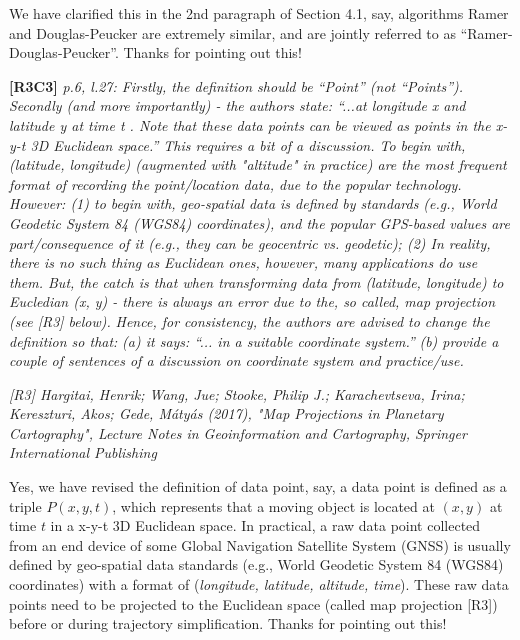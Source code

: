 \documentclass{letter}
\begin{document}
We have clarified this in the 2nd paragraph of Section 4.1, say, algorithms Ramer and Douglas-Peucker are extremely similar, and are jointly referred to as ``Ramer-Douglas-Peucker''.
Thanks for pointing out this!



\textbf{[R3C3]} \emph{p.6, l.27: Firstly, the definition should be ``Point'' (not ``Points''). Secondly (and more importantly) - the authors state: ``...at longitude x and latitude y at time t . Note that these data points can be viewed as points in the x-y-t 3D Euclidean space.'' This requires a bit of a discussion. To begin with, (latitude, longitude) (augmented with "altitude" in practice) are the most frequent format of recording the point/location data, due to the popular technology. However: (1) to begin with, geo-spatial data is defined by standards (e.g., World Geodetic System 84 (WGS84) coordinates), and the popular GPS-based values are part/consequence of it (e.g., they can be geocentric vs. geodetic); (2) In reality, there is no such thing as Euclidean ones, however, many applications do use them. But, the catch is that when transforming data from (latitude, longitude) to Eucledian (x, y) - there is always an error due to the, so called, map projection (see [R3] below).}
\emph{Hence, for consistency, the authors are advised to change the definition so that:}
\emph{(a) it says: ``... in a suitable coordinate system.''}
\emph{(b) provide a couple of sentences of a discussion on coordinate system and practice/use.}

\emph{[R3] Hargitai, Henrik; Wang, Jue; Stooke, Philip J.; Karachevtseva, Irina; Kereszturi, Akos; Gede, Mátyás (2017), "Map Projections in Planetary Cartography", Lecture Notes in Geoinformation and Cartography, Springer International Publishing}

Yes, we have revised the definition of data point, say, a data point is defined as a triple $P(x, y, t)$, {which represents that a moving object is located at {$(x, y)$} at time $t$ in a x-y-t 3D Euclidean space. 
In practical, a raw data point collected from an end device of some Global Navigation Satellite System (GNSS) is usually defined by geo-spatial data standards (e.g., World Geodetic System 84 (WGS84) coordinates) with a format of ({\em longitude, latitude, altitude, time}). These raw data points need to be projected to the Euclidean space (called map projection [R3]) before or during trajectory simplification.} 
Thanks for pointing out this!
\end{document}

